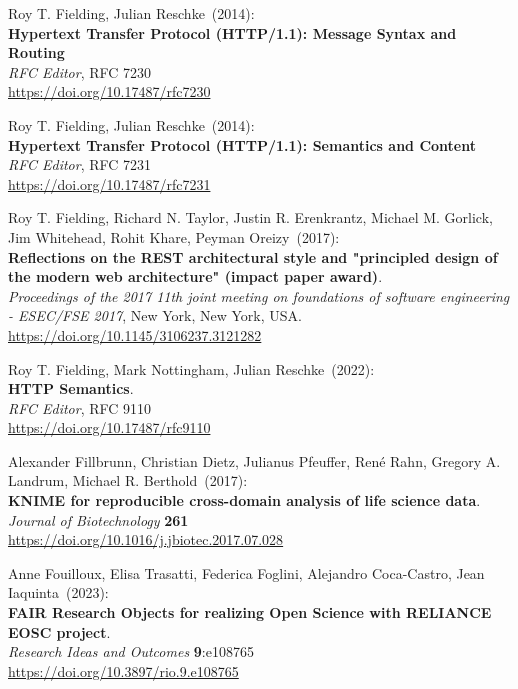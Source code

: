 \begin{thebibliography}{9}
Roy T. Fielding, Julian Reschke~(2014): \\
\textbf{Hypertext {Transfer Protocol} ({HTTP}/1.1): {Message Syntax} and {Routing}}\\
\emph{RFC Editor}, RFC 7230 \\
\url{https://doi.org/10.17487/rfc7230}

Roy T. Fielding, Julian Reschke~(2014): \\
\textbf{Hypertext {Transfer Protocol} ({HTTP}/1.1): {Semantics} and {Content}} \\
\emph{RFC Editor}, RFC 7231 \\
\url{https://doi.org/10.17487/rfc7231}

Roy T. Fielding, Richard N. Taylor, Justin R. Erenkrantz, Michael M. Gorlick, Jim Whitehead, Rohit Khare, Peyman Oreizy~(2017): \\
\textbf{Reflections on the {REST} architectural style and "principled
design of the modern web architecture" (impact paper award)}. \\
\emph{Proceedings of the 2017 11th joint meeting on foundations of software engineering - {ESEC}/{FSE} 2017}, New York, New York, USA.\\
\url{https://doi.org/10.1145/3106237.3121282}

Roy T. Fielding, Mark Nottingham, Julian Reschke~(2022): \\
\textbf{HTTP Semantics}.\\
\emph{RFC Editor}, RFC 9110\\
\url{https://doi.org/10.17487/rfc9110}

Alexander Fillbrunn, Christian Dietz, Julianus Pfeuffer, René Rahn, Gregory A. Landrum, Michael R. Berthold~(2017): \\
\textbf{KNIME for reproducible cross-domain analysis of life science data}.\\
\emph{Journal of Biotechnology} \textbf{261}\\
\url{https://doi.org/10.1016/j.jbiotec.2017.07.028}

Anne Fouilloux, Elisa Trasatti, Federica Foglini, Alejandro Coca-Castro, Jean Iaquinta~(2023): \\
\textbf{FAIR Research Objects for realizing Open Science with RELIANCE EOSC project}.\\
\emph{Research Ideas and Outcomes} \textbf{9}:e108765 \\
\url{https://doi.org/10.3897/rio.9.e108765}


\end{thebibliography}
